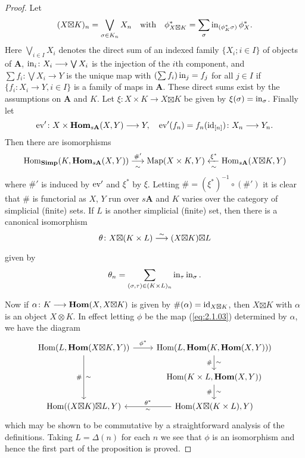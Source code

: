 \documentclass[../main]{subfiles}
\begin{document}
\begin{proof}
Let \[(X \mathbf \boxtimes K)_n = \bigvee_{\sigma \in K_n} X_n\quad\text{with}\quad \phi^*_{X \mathbf \boxtimes K} = \sum_\sigma \operatorname{in}_{(\phi^*_K\sigma)}\phi^*_X.\] Here $\bigvee_{i \in I} X_i$ denotes the direct sum of an indexed family $\{X_i; i \in I\}$ of objects of $\mathbf A$, $\operatorname{in}_i \colon X_i \longrightarrow \bigvee X_i$ is the injection of the $i$th component, and $\sum f_i \colon \bigvee X_i \longrightarrow Y$ is the unique map with $(\sum f_i) \operatorname{in}_j = f_j$ for all $j \in I$ if $\{f_i \colon X_i \longrightarrow Y, i \in I\}$ is a family of maps in $\mathbf A$. These direct sums exist by the assumptions on $\mathbf A$ and $K$. Let $\xi \colon X \times K \longrightarrow X \mathbf \boxtimes K$ be given by $\xi(\sigma) = \operatorname{in}_\sigma$. Finally let \[\operatorname{ev}' \colon X \times \operatorname{\mathbf{Hom}}_{s\mathbf A} (X, Y) \longrightarrow Y, \quad \operatorname{ev}'(f_n) = f_n(\operatorname{id}_{[n]}) \colon X_n \longrightarrow Y_n.\] Then there are isomorphisms 
\[
\Hom_{\mathbf{Simp}}(K, \UHom_{s\mathbf A}(X, Y)) \varrightarrow[\sim]{\#'} \Map(X \times K, Y) \xleftarrow[\sim]{\xi^*} \Hom_{s\mathbf A}(X \mathbf \boxtimes K, Y)
\]
where $\#'$ is induced by $\operatorname{ev}'$ and $\xi^*$ by $\xi$. Letting $\# = (\xi^*)^{-1} \circ (\#')$ it is clear that $\#$ is functorial as $X$, $Y$ run over $s\mathbf A$ and $K$ varies over the category of simplicial (finite) sets. If $L$ is another simplicial (finite) set, then there is a canonical isomorphism
\[
\theta \colon X \mathbf \boxtimes (K \times L) \varrightarrow{\sim} (X \mathbf \boxtimes K) \mathbf \boxtimes L
\]
given by 
\[
\theta_n = \sum_{(\sigma, \tau) \in (K \times L)_n} \operatorname{in}_\tau \operatorname{in}_\sigma.
\]

Now if $\alpha \colon K \longrightarrow \operatorname{\mathbf{Hom}}(X, X \mathbf \boxtimes K)$ is given by $\#(\alpha) = \operatorname{id}_{X \mathbf \boxtimes K}$, then $X \mathbf \boxtimes K$ with $\alpha$ is an object $X \otimes K$. In effect letting $\phi$ be the map (\ref{eq:2.1.03}) determined by $\alpha$, we have the diagram
\[
\begin{tikzcd}
    {\Hom(L, \UHom(X \mathbf \boxtimes K, Y))}
    \arrow[r, "\phi^*"]
    \arrow[dd, "\#"', "\sim"]
    &
    {\Hom(L, \UHom(K, \UHom(X, Y)))}
    \arrow[d, "\#"', "\sim"]
    \\&
    {\Hom(K \times L, \UHom(X, Y))}
    \arrow[d, "\#"', "\sim"]
    \\
    {\Hom((X \mathbf \boxtimes K) \mathbf \boxtimes L, Y)}
    &
    {\Hom(X \mathbf \boxtimes (K \times L), Y)}
    \arrow[l, "\theta^*"', "\sim"]
\end{tikzcd}
\]
which may be shown to be commutative by a straightforward analysis of the definitions. Taking $L = \Delta(n)$ for each $n$ we see that $\phi$ is an isomorphism and hence the first part of the proposition is proved.


\end{proof}
\end{document}
